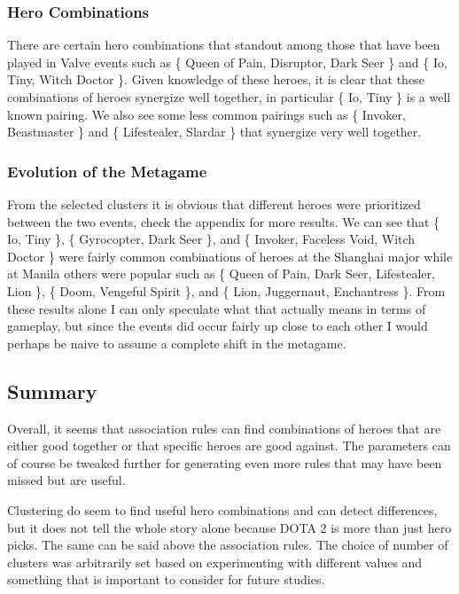 \documentclass[result.tex]{subfiles}
\begin{document}
\subsubsection*{Hero Combinations}

There are certain hero combinations that standout among those that have been played in Valve events such as \{ Queen of Pain, Disruptor, Dark Seer \} and \{ Io, Tiny, Witch Doctor \}. Given knowledge of these heroes, it is clear that these combinations of heroes synergize well together, in particular \{ Io, Tiny \} is a well known pairing. We also see some less common pairings such as \{ Invoker, Beastmaster \} and \{ Lifestealer, Slardar \} that synergize very well together.

\subsubsection*{Evolution of the Metagame}

From the selected clusters it is obvious that different heroes were prioritized between the two events, check the appendix for more results. We can see that \{ Io, Tiny \}, \{ Gyrocopter, Dark Seer \}, and \{ Invoker, Faceless Void, Witch Doctor \} were fairly common combinations of heroes at the Shanghai major while at Manila others were popular such as \{ Queen of Pain, Dark Seer, Lifestealer, Lion \}, \{ Doom, Vengeful Spirit \}, and \{ Lion, Juggernaut, Enchantress \}. From these results alone I can only speculate what that actually means in terms of gameplay, but since the events did occur fairly up close to each other I would perhaps be naive to assume a complete shift in the metagame.


\subsection*{Summary}

Overall, it seems that association rules can find combinations of heroes that are either good together or that specific heroes are good against. The parameters can of course be tweaked further for generating even more rules that may have been missed but are useful.

Clustering do seem to find useful hero combinations and can detect differences, but it does not tell the whole story alone because DOTA 2 is more than just hero picks. The same can be said above the association rules. The choice of number of clusters was arbitrarily set based on experimenting with different values and something that is important to consider for future studies.
\end{document}
